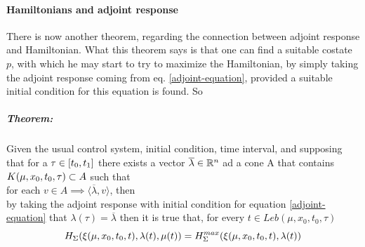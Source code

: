 \paragraph[5.13]{Hamiltonians and adjoint response}
There is now another theorem, regarding the connection between adjoint response and Hamiltonian. What this theorem says is that one can find a suitable costate $p$, with which he may start to try to maximize the Hamiltonian, by simply taking the adjoint response coming from eq. \ref{adjoint-equation}, provided a suitable initial condition for this equation is found.  So
\subparagraph[lemma 5.13]{Theorem:} Given the usual control system, initial condition, time interval, and supposing that for a $\tau\in[t_0,t_1]$ there exists a vector $\overline{\lambda}\in\mathbb{R}^n$ ad a cone A that contains $K(\mu,x_0,t_0,\tau)\subset A$ such that\\
for each $v\in A \implies \langle \overline{\lambda},v\rangle$, then \\
by taking the adjoint response with initial condition for equation \ref{adjoint-equation} that $\lambda(\tau)=\overline{\lambda}$ then it is true that, for every $t\in Leb(\mu,x_0,t_0,\tau)$
\[ H_\Sigma(\xi(\mu,x_0,t_0,t),\lambda(t),\mu(t))=H_\Sigma^{max}(\xi(\mu,x_0,t_0,t),\lambda(t)) \]

